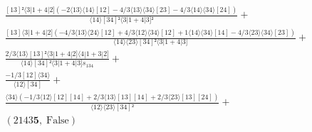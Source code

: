 \documentclass[varwidth, border=5pt]{standalone}
\begin{document}
\begin{my}
$\begin{gathered}
\scriptscriptstyle\frac{[13]²⟨3|1+4|2](-2⟨13⟩⟨14⟩[12]-4/3⟨13⟩⟨34⟩[23]-4/3⟨14⟩⟨34⟩[24])}{⟨14⟩[34]²⟨3|1+4|3]²} +\\
\scriptscriptstyle\frac{[13]⟨3|1+4|2](-4/3⟨13⟩⟨24⟩[12]+4/3⟨12⟩⟨34⟩[12]+1⟨14⟩⟨34⟩[14]-4/3⟨23⟩⟨34⟩[23])}{⟨14⟩⟨23⟩[34]²⟨3|1+4|3]} +\\
\scriptscriptstyle\frac{2/3⟨13⟩[13]²⟨3|1+4|2]⟨4|1+3|2]}{⟨14⟩[34]²⟨3|1+4|3]s_{134}} +\\
\scriptscriptstyle\frac{-1/3[12]⟨34⟩}{⟨12⟩[34]} +\\
\scriptscriptstyle\frac{⟨34⟩(-1/3⟨12⟩[12][14]+2/3⟨13⟩[13][14]+2/3⟨23⟩[13][24])}{⟨12⟩⟨23⟩[34]²} +\\
\scriptscriptstyle(2143𝟓,\;\text{False}) \phantom{+}
\end{gathered}$
\end{my}
\end{document}
